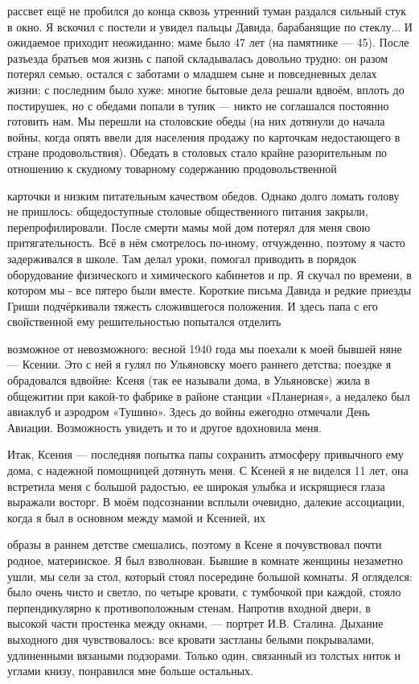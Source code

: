 \label{191-1}
рассвет ещё не пробился до конца сквозь утренний туман 
раздался сильный стук в окно. Я вскочил с постели и увидел пальцы Давида, барабанящие по стеклу... И ожидаемое приходит неожиданно; маме было 47 лет (на памятнике — 45). 
После разъезда братьев моя жизнь с папой складывалась довольно трудно: он разом потерял семью, остался с заботами о младшем сыне и повседневных делах жизни; с последним было хуже: многие бытовые дела решали вдвоём, вплоть до постирушек, но с обедами попали в тупик — никто не соглашался постоянно готовить нам. Мы перешли на столовские обеды (на них дотянули до начала войны, когда опять ввели для населения продажу по карточкам недостающего в стране продовольствия). Обедать в столовых стало крайне разорительным по отношению к скудному товарному содержанию продовольственной

\label{192-1}
карточки и низким питательным качеством обедов. Однако долго ломать голову не пришлось: общедоступные столовые общественного питания закрыли, перепрофилировали. После смерти мамы мой дом потерял для меня свою притягательность. Всё в нём смотрелось по-иному, отчужденно, поэтому я часто задерживался в школе. Там делал уроки, помогал приводить в порядок оборудование физического и химического кабинетов и пр. Я скучал по времени, в котором мы - все пятеро были вместе. Короткие письма Давида и редкие приезды Гриши подчёркивали тяжесть сложившегося положения. И здесь папа с его свойственной ему решительностью попытался отделить

\label{193-1}
возможное от невозможного: весной 1940 года мы поехали к моей бывшей няне — Ксении. Это с ней я гулял по Ульяновску моего раннего детства; поездке я обрадовался вдвойне: Ксеня (так ее называли дома, в Ульяновске) жила в общежитии при какой-то фабрике в районе станции «Планерная», а недалеко был авиаклуб и аэродром «Тушино». Здесь до войны ежегодно отмечали День Авиации. Возможность увидеть и то и другое вдохновила меня.

Итак, Ксения — последняя попытка папы сохранить атмосферу привычного ему дома, с надежной помощницей дотянуть меня. С Ксеней я не виделся 11 лет, она встретила меня с большой радостью, ее широкая улыбка и искрящиеся глаза выражали восторг. В моём подсознании всплыли очевидно, далекие ассоциации, когда я был в основном между мамой и Ксенией, их

\label{194-1}
образы в раннем детстве смешались, поэтому в Ксене я почувствовал почти родное, материнское. Я был взволнован. Бывшие в комнате женщины незаметно ушли, мы сели за стол, который стоял посередине большой комнаты. Я огляделся: было очень чисто и светло, по четыре кровати, с тумбочкой при каждой, стояло перпендикулярно к противоположным стенам. Напротив входной двери, в высокой части простенка между окнами, — портрет И.В. Сталина. Дыхание выходного дня чувствовалось: все кровати застланы белыми покрывалами, удлиненными вязаными подзорами. Только один, связанный из толстых ниток и углами книзу, понравился мне больше остальных.

